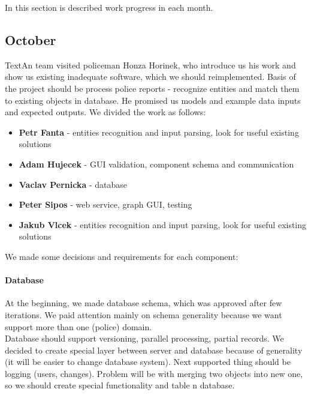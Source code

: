 In this section is described work progress in each month.
\subsection{October}
TextAn team visited policeman Honza Horinek, who introduce us his work and show us existing inadequate software, which we should reimplemented. Basis of the project should be process police reports - recognize entities and match them to existing objects in database. He promised us models and example data inputs and expected outputs. We divided the work as follows:
\begin{itemize}
\item \textbf{Petr Fanta} - entities recognition and input parsing, look for useful existing solutions
\item \textbf{Adam Hujecek} - GUI validation, component schema and communication
\item \textbf{Vaclav Pernicka} - database
\item \textbf{Peter Sipos} - web service, graph GUI, testing
\item \textbf{Jakub Vlcek} - entities recognition and input parsing, look for useful existing solutions
\end{itemize}
We made some decisions and requirements for each component:
\paragraph{Database}
At the beginning, we made database schema, which was approved after few iterations. We paid attention mainly on schema generality because we want support more than one (police) domain.\\
Database should support versioning, parallel processing, partial records. We decided to create special layer between server and database because of generality (it will be easier to change database system).
Next supported thing should be logging (users, changes).
Problem will be with merging two objects into new one, so we should create special functionality and table n database.

